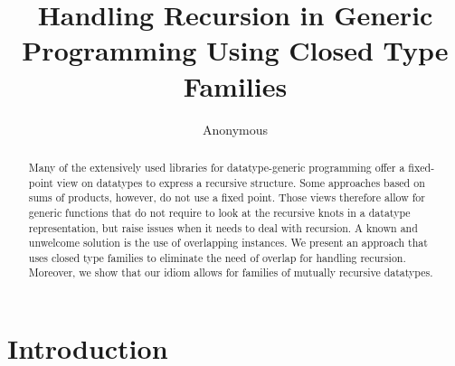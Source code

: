 \documentclass[runningheads]{llncs}
\begin{document}
%
\title{Handling Recursion in Generic Programming Using Closed Type Families}
%
%
\author{Anonymous%
}
%
%
%
\maketitle              %
%
\begin{abstract}
Many of the extensively used libraries for datatype-generic programming offer a fixed-point view on datatypes to express a recursive structure. Some approaches based on sums of products, however, do not use a fixed point. Those views therefore allow for generic functions that do not require to look at the recursive knots in a datatype representation, but raise issues when it needs to deal with recursion. A known and unwelcome solution is the use of overlapping instances. We present an approach that uses closed type families to eliminate the need of overlap for handling recursion. Moreover, we show that our idiom allows for families of mutually recursive datatypes.


\end{abstract}
%
%
%
\section{Introduction}
\label{sec:introduction}
\end{document}
